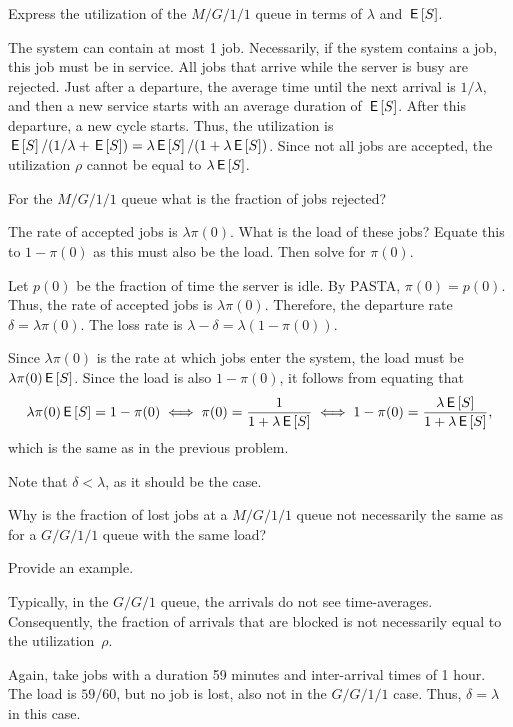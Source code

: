 \begin{extra}
  Express the utilization of the $M/G/1/1$ queue in terms of $\lambda$ and $\,\mathsf{E}\left[S\right]$.
  \begin{solution}
    The system can contain at most 1 job.
    Necessarily, if the system contains a job, this job must be in service.
    All jobs that arrive while the server is busy are rejected.
    Just after a departure, the average time until the next arrival is $1/\lambda$, and then a new service starts with an average duration of $\,\mathsf{E}\left[S\right]$.
    After this departure, a new cycle starts.
    Thus, the utilization is $\,\mathsf{E}\left[S\right]/(1/\lambda + \,\mathsf{E}\left[S\right]) = \lambda \,\mathsf{E}\left[S\right]/ (1 + \lambda \,\mathsf{E}\left[S\right])$.
    Since not all jobs are accepted, the utilization $\rho$ cannot be equal to $\lambda \,\mathsf{E}\left[S\right]$.
  \end{solution}
\end{extra}

\begin{extra}
  For the $M/G/1/1$ queue what is the fraction of jobs rejected?
  \begin{hint}
    The rate of accepted jobs is $\lambda \pi(0)$.
    What is the load of these jobs?
    Equate this to $1-\pi(0)$ as this must also be the load.
    Then solve for $\pi(0)$.
  \end{hint}
  \begin{solution}
    Let $p(0)$ be the fraction of time the server is idle. By PASTA,
    $\pi(0)=p(0)$. Thus, the rate of accepted jobs is
    $\lambda\pi(0)$. Therefore, the departure rate
    $\delta=\lambda\pi(0)$. The loss rate is
    $\lambda-\delta = \lambda (1-\pi(0))$.

    Since $\lambda\pi(0)$ is the rate at which jobs enter the system,
    the load must be $\lambda\pi(0)\,\mathsf{E}\left[S\right]$. Since the load is also
    $1-\pi(0)$, it follows from equating that
    \begin{equation*}
      \lambda\pi(0) \,\mathsf{E}\left[S\right] = 1 - \pi(0) \iff \pi(0)=\frac1{1+\lambda\,\mathsf{E}\left[S\right]} 
\iff 1-\pi(0) = \frac{\lambda \,\mathsf{E}\left[S\right]}{1+\lambda \,\mathsf{E}\left[S\right]},
    \end{equation*}
which is the same as in the previous problem.

Note that  $\delta < \lambda$, as it should be the case. 
  \end{solution}
\end{extra}


\begin{extra}
  Why is the fraction of lost jobs at a $M/G/1/1$ queue not necessarily the same as for a $G/G/1/1$ queue with the same load?
  \begin{hint}
Provide an  example.
  \end{hint}
  \begin{solution}
 Typically, in the $G/G/1$ queue, the arrivals do not see  time-averages. Consequently, the fraction of arrivals that are blocked is not necessarily equal to the utilization~$\rho$.

  Again, take jobs with a duration 59 minutes and inter-arrival times of
  1 hour. The load is $59/60$, but no job is lost, also not in the
  $G/G/1/1$ case. Thus, $\delta=\lambda$ in this case.
  \end{solution}
\end{extra}



